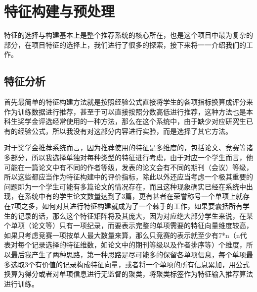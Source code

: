 %
%
%
%
%
%

\chapter{特征构建与预处理}

特征的选择与构建基本上是整个推荐系统的核心所在，也是这个项目中最为复杂的部分，在项目特征的选择上，我们进行了很多的探索，接下来将一一介绍我们的工作。

\section{特征分析}

首先最简单的特征构建方法就是按照经验公式直接将学生的各项指标换算成评分来作为训练数据进行推荐，甚至于可以直接按照分数高低进行推荐，这种方法也是本科生奖学金评选经常使用的一种方法，那么在这个系统中，由于缺少对应研究生已有的经验公式，所以我没有对这部分内容进行实验，而是选择了其它方法。

对于奖学金推荐系统而言，因为推荐使用的特征是多维度的，包括论文、竞赛等诸多部分，所以我选择单独对每种类型的特征进行考虑，由于对应一个学生而言，他可能在一篇论文中有不同的作者等级，发表的论文会有不同的期刊（会议）等级，所以这些都应当作为特征构建中的评价指标，除此以外还应当考虑一个极其重要的问题即为一个学生可能有多篇论文的情况存在，而且这种现象确实已经在系统中出现，在系统中有的学生论文数量达到了3篇，更有甚者在荣誉称号一个单项上就存在7项之多，如何对其进行特征构建就成为了一个棘手的工作，如果要囊括所有学生的记录的话，那么这个特征矩阵将及其庞大，因为对应绝大部分学生来说，在某个单项（论文等）只有一项纪录，而要表示完整的单项需要的特征向量维度较高，如果只考虑竞赛一项按单人最大数量来算，那么只竞赛的表示就至少有7*n（n代表对每个记录选择的特征维数，如论文中的期刊等级以及作者排序等）个维度，所以最后我产生了两种思路，第一种思路是尽可能多的保留各单项信息，每个单项最多选取3个有价值的记录构成特征向量，或者将一个单项的所有信息累加，用公式换算为得分或者对单项信息进行无监督的聚类，将聚类标签作为特征输入推荐算法进行训练。

